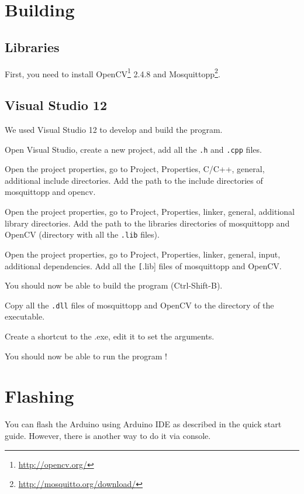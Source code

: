 \documentclass[a4paper,11pt]{report}
\begin{document}
\section{Building}

\subsection{Libraries}

First, you need to install OpenCV\footnote{\url{http://opencv.org/}} 2.4.8 and
Mosquittopp\footnote{\url{http://mosquitto.org/download/}}.

\subsection{Visual Studio 12}

We used Visual Studio 12 to develop and build the program.

Open Visual Studio, create a new project, add all the \texttt{.h} and
\texttt{.cpp} files.

Open the project properties, go to Project, Properties, C/C++, general,
additional include directories. Add the path to the include directories of
mosquittopp and opencv.

Open the project properties, go to Project, Properties, linker, general,
additional library directories. Add the path to the libraries directories of
mosquittopp and OpenCV (directory with all the \texttt{.lib} files).

Open the project properties, go to Project, Properties, linker, general, input,
additional dependencies. Add all the \texttt[.lib] files of mosquittopp and
OpenCV.

You should now be able to build the program (Ctrl-Shift-B).

Copy all the \texttt{.dll} files of mosquittopp and OpenCV to the directory of
the executable.

Create a shortcut to the .exe, edit it to set the arguments.

You should now be able to run the program !

\section{Flashing}
\label{sec:Flashing} %

You can flash the Arduino using Arduino IDE as described in the quick start
guide. However, there is another way to do it via console.
\end{document}
